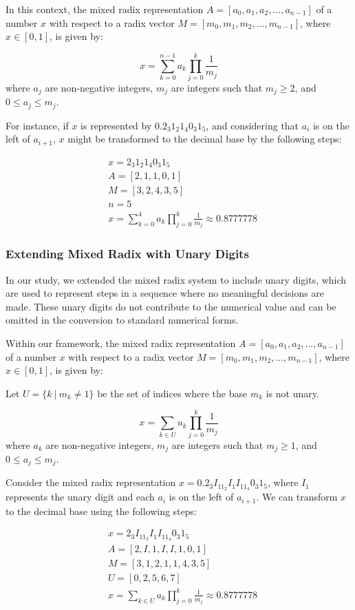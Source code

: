 In this context, the mixed radix representation $A=[a_{0},a_{1},a_{2},...,a_{n-1}]$ 
of a number $x$ with respect to a radix vector $M=[m_{0},m_{1},m_{2},...,m_{n-1}]$,
where $x \in [0,1]$, is given by:

\begin{equation}
	x = \sum_{k=0}^{n-1} a_{k} \prod_{j=0}^{k} \frac{1}{m_j}
\end{equation}
where $a_j$ are non-negative integers, $m_j$ are integers such that $m_j \geq 2$, and $0 \leq a_j \leq m_j$. \cite{Arthur2023}


For instance, if $x$ is represented by $0.2_{3}1_{2}1_{4}0_{3}1_{5}$, and considering that $a_{i}$ is on the left of $a_{i+1}$, $x$ might be transformed to the decimal base by the following steps:

\begin{align}
& x=2_{3}1_{2}1_{4}0_{3}1_{5}\\
& A=[2,1,1,0,1]\\
& M=[3,2,4,3,5]\\
& n=5\\
& x = \sum_{k=0}^{4} a_{k} \prod_{j=0}^{k} \frac{1}{m_j} \approx 0.8777778
\end{align}

\subsubsection{Extending Mixed Radix with Unary Digits}
\label{section_definitions_unary_mixed_radix}

In our study, we extended the mixed radix system to include unary digits,
which are used to represent steps in a sequence where no meaningful decisions are made.
These unary digits do not contribute to the numerical value and can be omitted in the conversion to standard numerical forms.

Within our framework, the mixed radix representation $A=[a_{0},a_{1},a_{2},...,a_{n-1}]$ 
of a number $x$ with respect to a radix vector $M=[m_{0},m_{1},m_{2},...,m_{n-1}]$,
where $x \in [0,1]$, is given by:

Let  $U = \{ k \ |\ m_k \neq 1 \} $ be the set of indices where the base \( m_k \) is not unary.

\begin{equation}
    \label{eq:unary_mixed_radix}
	x = \sum_{k \in U} u_{k} \prod_{j=0}^{k} \frac{1}{m_j}
\end{equation}
where $a_k$ are non-negative integers, $m_j$ are integers such that $m_j \geq 1$, and $0 \leq a_j \leq m_j$.

Consider the mixed radix representation $x=0.2_{3}I_11_{2}I_1I_11_{4}0_{3}1_{5}$, where $I_1$ represents the unary digit and each $a_{i}$ is on the left of $a_{i+1}$. We can transform
$x$ to the decimal base using the following steps:

\begin{align}
    & x=2_{3}I_11_{2}I_1I_11_{4}0_{3}1_{5}\\
    & A=[2,I,1,I,I,1,0,1]\\
    & M=[3,1,2,1,1,4,3,5]\\
    & U=[0,2,5,6,7]\\
    & x = \sum_{k \in U} a_{k} \prod_{j=0}^{k} \frac{1}{m_j} \approx 0.8777778
\end{align}
